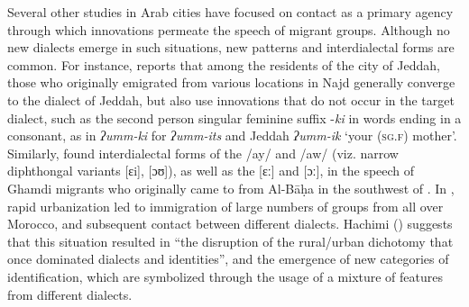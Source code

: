 \documentclass[output=paper]{langsci/langscibook}
\begin{document}
Several other studies in Arab cities have focused on contact as a primary agency through which innovations permeate the speech of migrant groups. Although no new dialects emerge in such situations, new patterns and interdialectal forms are common. For instance, \citet{Al-Essa2009} reports that among the residents of the city of Jeddah, those who originally emigrated from various locations in Najd generally converge to the dialect of Jeddah, but also use innovations that do not occur in the target dialect, such as the second person singular feminine suffix -\textit{ki} in words ending in a consonant, as in \textit{ʔumm-ki} for  \textit{ʔumm-its} and Jeddah \textit{ʔumm-ik} ‘your (\textsc{sg.f}) mother’. Similarly, \citet{Alghamdi2014} found interdialectal forms of the  /ay/ and /aw/ (viz. narrow diphthongal variants [ɛi], [ɔʊ]), as well as the  [ɛː] and [ɔː], in the speech of {Ghamdi} migrants who originally came to  from Al-Bāḥa in the southwest of . In , rapid urbanization led to immigration of large numbers of groups from all over Morocco, and subsequent contact between different dialects. Hachimi (\citeyear[97]{Hachimi2007}) suggests that this situation resulted in “the disruption of the rural/urban dichotomy that once dominated  dialects and identities”, and the emergence of new categories of identification, which are symbolized through the usage of a mixture of features from different dialects.
\end{document}
